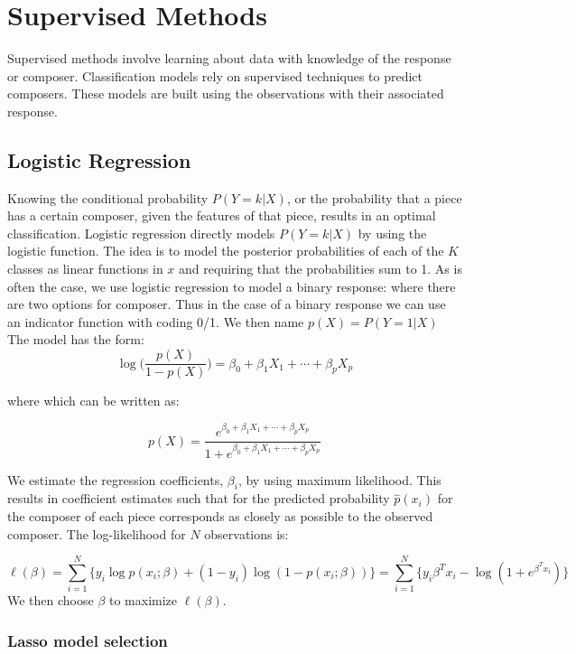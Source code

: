 \documentclass[12pt,twoside]{reedthesis}
\theoremstyle{definition}
\theoremstyle{definition}
\theoremstyle{definition}
\theoremstyle{remark}
\begin{document}
\section{Supervised Methods}\label{supervised-methods}

Supervised methods involve learning about data with knowledge of the
response or composer. Classification models rely on supervised
techniques to predict composers. These models are built using the
observations with their associated response.

\subsection{Logistic Regression}\label{logistic-regression}

Knowing the conditional probability \(P(Y = k|X)\), or the probability
that a piece has a certain composer, given the features of that piece,
results in an optimal classification. Logistic regression directly
models \(P(Y = k|X)\) by using the logistic function. The idea is to
model the posterior probabilities of each of the \(K\) classes as linear
functions in \(x\) and requiring that the probabilities sum to 1. As is
often the case, we use logistic regression to model a binary response:
where there are two options for composer. Thus in the case of a binary
response we can use an indicator function with coding 0/1. We then name
\(p(X) = P(Y=1|X)\) The model has the form:
\[ \log \bigg( \frac{p(X)}{1-p(X)} \bigg) = \beta_0 + \beta_1 X_1 + \cdots + \beta_pX_p\]

where which can be written as:

\[ p(X) = \frac{e^{\beta_0 + \beta_1X_1 + \cdots + \beta_pX_p}}{1 +e^{\beta_0 + \beta_1X_1 + \cdots + \beta_pX_p} }\]

We estimate the regression coefficients, \(\beta_i\), by using maximum
likelihood. This results in coefficient estimates such that for the
predicted probability \(\hat{p}(x_i)\) for the composer of each piece
corresponds as closely as possible to the observed composer. The
log-likelihood for \(N\) observations is:

\[ \ell(\beta) = \sum_{i = 1}^N \big\{y_i\log p(x_i;\beta) + (1-y_i)\log(1-p(x_i;\beta))\big\} = \sum_{i = 1}^N \big\{y_i\beta^Tx_i - \log(1 + e^{\beta^Tx_i})\big\}\]
We then choose \(\beta\) to maximize \(\ell(\beta)\).

\subsubsection{Lasso model selection}\label{lasso-model-selection}
\end{document}
